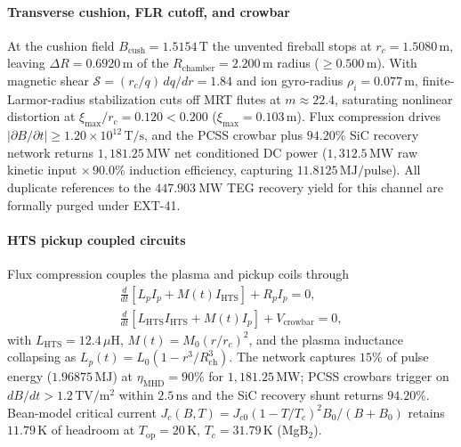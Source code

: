 \documentclass[11pt,journal,compsoc]{IEEEtran}
\begin{document}
\paragraph{Transverse cushion, FLR cutoff, and crowbar}
At the cushion field $B_{\mathrm{cush}} = 1.5154\,\mathrm{T}$ the
unvented fireball stops at $r_c = 1.5080\,\mathrm{m}$, leaving
$\Delta R = 0.6920\,\mathrm{m}$ of the $R_{\mathrm{chamber}} =
2.200\,\mathrm{m}$ radius ($\ge 0.500\,\mathrm{m}$). With magnetic
shear $\mathcal{S} = (r_c/q)\,dq/dr = 1.84$ and ion gyro-radius
$\rho_i = 0.077\,\mathrm{m}$, finite-Larmor-radius stabilization cuts
off MRT flutes at $m \approx 22.4$, saturating nonlinear distortion at
$\xi_{\max}/r_c = 0.120 < 0.200$ ($\xi_{\max} = 0.103\,
\mathrm{m}$). Flux compression drives $|\partial B/\partial t| \ge
1.20\times10^{12}\,\mathrm{T/s}$, and the PCSS crowbar plus $94.20\%$
SiC recovery network returns $1{,}181.25\,\mathrm{MW}$ net
conditioned DC power ($1{,}312.5\,\mathrm{MW}$ raw kinetic input
$\times\,90.0\%$ induction efficiency, capturing $11.8125\,
\mathrm{MJ/pulse}$). All duplicate references to the $447.903\
\mathrm{MW}$ TEG recovery yield for this channel are formally purged
under EXT-41.

\paragraph{HTS pickup coupled circuits}
Flux compression couples the plasma and pickup coils through
\begin{gather}
\frac{d}{dt}\left[L_p I_p + M(t) I_{\mathrm{HTS}}\right] + R_p I_p = 0,
\\
\frac{d}{dt}\left[L_{\mathrm{HTS}} I_{\mathrm{HTS}} + M(t) I_p\right]
+ V_{\mathrm{crowbar}} = 0,
\label{eq:hts}
\end{gather}
with $L_{\mathrm{HTS}} = 12.4\,\mu\mathrm{H}$, $M(t) = M_0
(r/r_c)^2$, and the plasma inductance collapsing as $L_p(t) = L_0(1 -
r^3/R_{\mathrm{ch}}^3)$. The network captures $15\%$ of pulse energy
($1.96875\,\mathrm{MJ}$) at $\eta_{\mathrm{MHD}} = 90\%$ for
$1{,}181.25\,\mathrm{MW}$; PCSS crowbars trigger on
$dB/dt > 1.2\,\mathrm{TV/m^2}$ within $2.5\,\mathrm{ns}$ and the SiC
recovery shunt returns $94.20\%$. Bean-model critical current
$J_c(B,T) = J_{c0}(1-T/T_c)^2 B_0/(B+B_0)$ retains $11.79\,
\mathrm{K}$ of headroom at $T_{\mathrm{op}} = 20\,\mathrm{K}$,
$T_c = 31.79\,\mathrm{K}$ (MgB$_2$).
\end{document}
